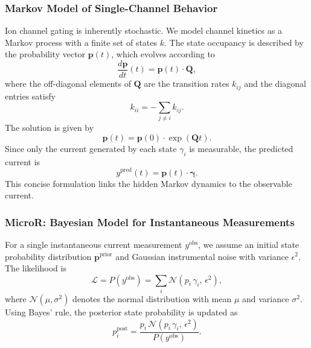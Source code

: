 \documentclass[pdflatex,sn-nature]{sn-jnl}%
\theoremstyle{thmstyleone}%
\theoremstyle{thmstyletwo}%
\theoremstyle{thmstylethree}%
\begin{document}
\subsubsection{Markov Model of Single-Channel Behavior}

Ion channel gating is inherently stochastic. We model channel kinetics as a Markov process with a finite set of states \(k\). The state occupancy is described by the probability vector \(\boldsymbol{p}(t)\), which evolves according to
\begin{equation}
	\frac{d\boldsymbol{p}}{dt}(t) = \boldsymbol{p}(t)\cdot \boldsymbol{Q},
	\label{eq:master_equation_short}
\end{equation}
where the off-diagonal elements of \(\boldsymbol{Q}\) are the transition rates \(k_{ij}\) and the diagonal entries satisfy
\begin{equation}
	k_{ii} = -\sum_{j\neq i} k_{ij}.
	\label{eq:Q_diag_short}
\end{equation}
The solution is given by
\begin{equation}
	\boldsymbol{p}(t) = \boldsymbol{p}(0) \cdot \exp(\boldsymbol{Q}t).
	\label{eq:solution_short}
\end{equation}
Since only the current generated by each state \(\gamma_i\) is measurable, the predicted current is
\begin{equation}
	y^{\text{pred}}(t) = \boldsymbol{p}(t)\cdot \boldsymbol{\gamma}.
	\label{eq:current_pred_short}
\end{equation}
This concise formulation links the hidden Markov dynamics to the observable current.

\subsubsection{MicroR: Bayesian Model for Instantaneous Measurements}

For a single instantaneous current measurement \(y^{\text{obs}}\), we assume an initial state probability distribution \(\boldsymbol{p}^{\text{prior}}\) and Gaussian instrumental noise with variance \(\epsilon^2\). The likelihood is
\begin{equation}
	\mathcal{L} = P(y^{\text{obs}}) = \sum_i \mathcal{N}(p_i\,\gamma_i,\,\epsilon^2),
	\label{eq:single_channel_likelihood_short}
\end{equation}
where \(\mathcal{N}(\mu,\sigma^2)\) denotes the normal distribution with mean \(\mu\) and variance \(\sigma^2\). Using Bayes' rule, the posterior state probability is updated as
\begin{equation}
	p^{\text{post}}_i = \frac{p_i\,\mathcal{N}(p_i\,\gamma_i,\,\epsilon^2)}{P(y^{\text{obs}})}.
	\label{eq:single_channel_posterior_short}
\end{equation}
\end{document}
